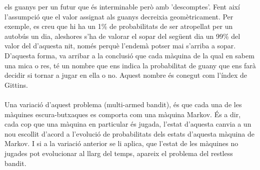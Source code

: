 els guanys per un futur que és interminable però amb 'descomptes'.
Fent així l'assumpció que el valor assignat als guanys decreixia
geomètricament. Per exemple, es creu que hi ha un 1\% de probabilitats de
ser atropellat per un autobús un dia, aleshores s'ha de valorar el sopar del
següent dia un 99\% del valor del d'aquesta nit, només perquè l'endemà potser mai
s'arriba a sopar. D'aquesta forma, va arribar a la conclusió que cada màquina
de la qual en sabem una mica o res, té un nombre que ens indica la probabilitat
de guany que ens farà decidir si tornar a jugar en ella o no. Aquest
nombre és conegut com l'índex de Gittins.\\\\
Una variació d'aquest problema (multi-armed bandit), és que cada una de
les màquines escura-butxaques es comporta com una màquina Markov. És a dir,
cada cop que una màquina en particular és jugada, l'estat d'aquesta canvia
a un nou escollit d'acord a l'evolució de probabilitats dels estats d'aquesta màquina de Markov.
I si a la variació anterior se li aplica, que l'estat de les màquines no jugades
pot evolucionar al llarg del temps, apareix el problema del restless bandit.
